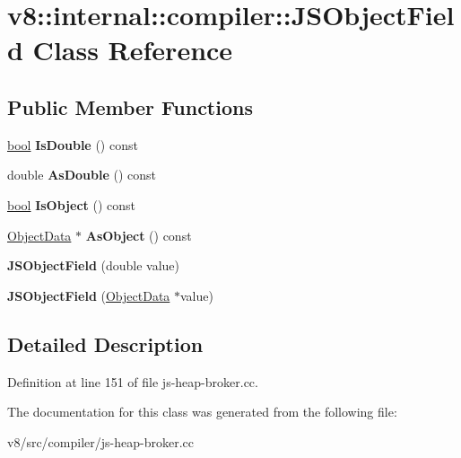 \hypertarget{classv8_1_1internal_1_1compiler_1_1JSObjectField}{}\section{v8\+:\+:internal\+:\+:compiler\+:\+:J\+S\+Object\+Field Class Reference}
\label{classv8_1_1internal_1_1compiler_1_1JSObjectField}
\subsection*{Public Member Functions}
\begin{DoxyCompactItemize}
\item 
\mbox{\label{classv8_1_1internal_1_1compiler_1_1JSObjectField_ac79a13deeab992cb976967ca1c02540b}} 
\mbox{\hyperlink{classbool}{bool}} {\bfseries Is\+Double} () const
\item 
\mbox{\label{classv8_1_1internal_1_1compiler_1_1JSObjectField_a9699e78adfe76d0d2a20f2f9c12ac77b}} 
double {\bfseries As\+Double} () const
\item 
\mbox{\label{classv8_1_1internal_1_1compiler_1_1JSObjectField_ab9796e26797f67fae5d322ae17316abe}} 
\mbox{\hyperlink{classbool}{bool}} {\bfseries Is\+Object} () const
\item 
\mbox{\label{classv8_1_1internal_1_1compiler_1_1JSObjectField_a465643d26c70dd089b397c248f6e1735}} 
\mbox{\hyperlink{classv8_1_1internal_1_1compiler_1_1ObjectData}{Object\+Data}} $\ast$ {\bfseries As\+Object} () const
\item 
\mbox{\label{classv8_1_1internal_1_1compiler_1_1JSObjectField_a91ff46d0f8712447a44137df05fb6398}} 
{\bfseries J\+S\+Object\+Field} (double value)
\item 
\mbox{\label{classv8_1_1internal_1_1compiler_1_1JSObjectField_a47286d04aa28f4fd816bb4dea4ec76a1}} 
{\bfseries J\+S\+Object\+Field} (\mbox{\hyperlink{classv8_1_1internal_1_1compiler_1_1ObjectData}{Object\+Data}} $\ast$value)
\end{DoxyCompactItemize}


\subsection{Detailed Description}


Definition at line 151 of file js-\/heap-\/broker.\+cc.



The documentation for this class was generated from the following file\+:\begin{DoxyCompactItemize}
\item 
v8/src/compiler/js-\/heap-\/broker.\+cc\end{DoxyCompactItemize}
